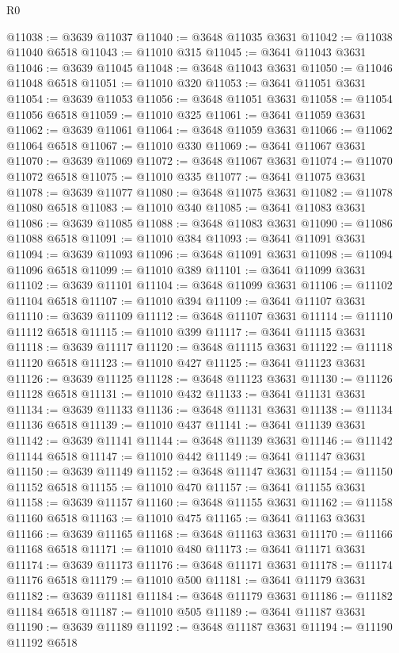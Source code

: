 \begin{lexlean}{R0}
\begin{coremodule}
@11038 := @3639 @11037
@11040 := @3648 @11035 @3631
@11042 := @11038 @11040 @6518
@11043 := @11010 @315
@11045 := @3641 @11043 @3631
@11046 := @3639 @11045
@11048 := @3648 @11043 @3631
@11050 := @11046 @11048 @6518
@11051 := @11010 @320
@11053 := @3641 @11051 @3631
@11054 := @3639 @11053
@11056 := @3648 @11051 @3631
@11058 := @11054 @11056 @6518
@11059 := @11010 @325
@11061 := @3641 @11059 @3631
@11062 := @3639 @11061
@11064 := @3648 @11059 @3631
@11066 := @11062 @11064 @6518
@11067 := @11010 @330
@11069 := @3641 @11067 @3631
@11070 := @3639 @11069
@11072 := @3648 @11067 @3631
@11074 := @11070 @11072 @6518
@11075 := @11010 @335
@11077 := @3641 @11075 @3631
@11078 := @3639 @11077
@11080 := @3648 @11075 @3631
@11082 := @11078 @11080 @6518
@11083 := @11010 @340
@11085 := @3641 @11083 @3631
@11086 := @3639 @11085
@11088 := @3648 @11083 @3631
@11090 := @11086 @11088 @6518
@11091 := @11010 @384
@11093 := @3641 @11091 @3631
@11094 := @3639 @11093
@11096 := @3648 @11091 @3631
@11098 := @11094 @11096 @6518
@11099 := @11010 @389
@11101 := @3641 @11099 @3631
@11102 := @3639 @11101
@11104 := @3648 @11099 @3631
@11106 := @11102 @11104 @6518
@11107 := @11010 @394
@11109 := @3641 @11107 @3631
@11110 := @3639 @11109
@11112 := @3648 @11107 @3631
@11114 := @11110 @11112 @6518
@11115 := @11010 @399
@11117 := @3641 @11115 @3631
@11118 := @3639 @11117
@11120 := @3648 @11115 @3631
@11122 := @11118 @11120 @6518
@11123 := @11010 @427
@11125 := @3641 @11123 @3631
@11126 := @3639 @11125
@11128 := @3648 @11123 @3631
@11130 := @11126 @11128 @6518
@11131 := @11010 @432
@11133 := @3641 @11131 @3631
@11134 := @3639 @11133
@11136 := @3648 @11131 @3631
@11138 := @11134 @11136 @6518
@11139 := @11010 @437
@11141 := @3641 @11139 @3631
@11142 := @3639 @11141
@11144 := @3648 @11139 @3631
@11146 := @11142 @11144 @6518
@11147 := @11010 @442
@11149 := @3641 @11147 @3631
@11150 := @3639 @11149
@11152 := @3648 @11147 @3631
@11154 := @11150 @11152 @6518
@11155 := @11010 @470
@11157 := @3641 @11155 @3631
@11158 := @3639 @11157
@11160 := @3648 @11155 @3631
@11162 := @11158 @11160 @6518
@11163 := @11010 @475
@11165 := @3641 @11163 @3631
@11166 := @3639 @11165
@11168 := @3648 @11163 @3631
@11170 := @11166 @11168 @6518
@11171 := @11010 @480
@11173 := @3641 @11171 @3631
@11174 := @3639 @11173
@11176 := @3648 @11171 @3631
@11178 := @11174 @11176 @6518
@11179 := @11010 @500
@11181 := @3641 @11179 @3631
@11182 := @3639 @11181
@11184 := @3648 @11179 @3631
@11186 := @11182 @11184 @6518
@11187 := @11010 @505
@11189 := @3641 @11187 @3631
@11190 := @3639 @11189
@11192 := @3648 @11187 @3631
@11194 := @11190 @11192 @6518

\end{coremodule}
\end{lexlean}
